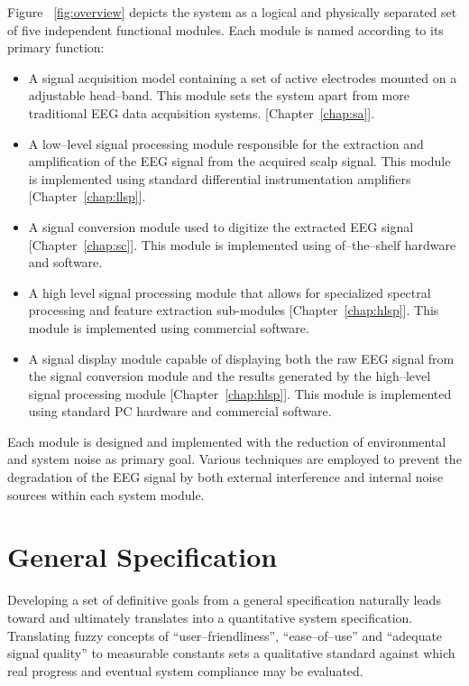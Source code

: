 Figure ~\vref{fig:overview} depicts the system as a logical and
physically separated set of five independent functional modules. Each
module is named according to its primary function:

\begin{itemize}
	\item{ A signal acquisition model containing a set of active
		  electrodes mounted on a adjustable head--band. This module
		  sets the system apart from more traditional EEG data
		  acquisition systems. [Chapter~\ref{chap:sa}].}
	\item{ A low--level signal processing module responsible for the
		  extraction and amplification of the EEG signal from the
		  acquired scalp signal. This module is implemented using
		  standard differential instrumentation amplifiers
		  [Chapter~\ref{chap:llsp}].}
	\item{ A signal conversion module used to digitize the extracted
          EEG signal [Chapter~\ref{chap:sc}].} This module is
		  implemented using of--the--shelf hardware and software.
	\item{ A high level signal processing module that allows for
	      specialized spectral processing and feature extraction
	      sub-modules [Chapter~\ref{chap:hlsp}].} This module is
		  implemented using commercial software. 
	\item{ A signal display module capable of displaying both the raw
		  EEG signal from the signal conversion module and the results
		  generated by the high--level signal processing module
		  [Chapter~\ref{chap:hlsp}].} This module is implemented using
		  standard PC hardware and commercial software.
\end{itemize}
	

Each module is designed and implemented with the reduction of
environmental and system noise as primary goal. Various techniques are
employed to prevent the degradation of the EEG signal by both external
interference and internal noise sources within each system module.


\section{General Specification}
\label{section:def-of-need}

Developing a set of definitive goals from a general specification
naturally leads toward and ultimately translates into a quantitative
system specification. Translating fuzzy concepts of
``user--friendliness'', ``ease--of--use'' and ``adequate signal
quality'' to measurable constants sets a qualitative standard against
which real progress and eventual system compliance may be evaluated.

